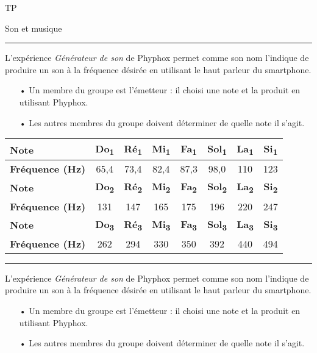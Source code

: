 \documentclass[12pt,a4paper]{article}
\begin{document}
\begin{header}
TP

Son et musique
\end{header}

\hrule{}
\vspace{5pt}

L'expérience \emph{Générateur de son} de Phyphox permet comme son nom l'indique de produire un son à la fréquence désirée en utilisant le haut parleur du smartphone.
\begin{itemize}
\item[•] Un membre du groupe est l'émetteur : il choisi une note et la produit en utilisant Phyphox.
\item[•] Les autres membres du groupe doivent déterminer de quelle note il s'agit.
\end{itemize}

\begin{center}
\begin{tabular}{l|c|c|c|c|c|c|c}
\textbf{Note}						& \textbf{Do\textsubscript{1}} & \textbf{Ré\textsubscript{1}} & \textbf{Mi\textsubscript{1}} & \textbf{Fa\textsubscript{1}} & \textbf{Sol\textsubscript{1}} & \textbf{La\textsubscript{1}} & \textbf{Si\textsubscript{1}} \\
\hline
\textbf{Fréquence (Hz)} 	& 65{,}4 & 73{,}4 & 82{,}4 & 87{,}3 & 98{,}0 & 110 & 123 \\
\hline \hline
\textbf{Note}						& \textbf{Do\textsubscript{2}} & \textbf{Ré\textsubscript{2}} & \textbf{Mi\textsubscript{2}} & \textbf{Fa\textsubscript{2}} & \textbf{Sol\textsubscript{2}} & \textbf{La\textsubscript{2}} & \textbf{Si\textsubscript{2}} \\
\hline
\textbf{Fréquence (Hz)} 	& 131 & 147 & 165 & 175 & 196 & 220 & 247 \\
\hline \hline
\textbf{Note}						& \textbf{Do\textsubscript{3}} & \textbf{Ré\textsubscript{3}} & \textbf{Mi\textsubscript{3}} & \textbf{Fa\textsubscript{3}} & \textbf{Sol\textsubscript{3}} & \textbf{La\textsubscript{3}} & \textbf{Si\textsubscript{3}} \\
\hline
\textbf{Fréquence (Hz)} 	& 262 & 294 & 330 & 350 & 392 & 440 & 494
\end{tabular}
\end{center}

\vspace{5pt}
\hrule{}
\vspace{5pt}

L'expérience \emph{Générateur de son} de Phyphox permet comme son nom l'indique de produire un son à la fréquence désirée en utilisant le haut parleur du smartphone.
\begin{itemize}
\item[•] Un membre du groupe est l'émetteur : il choisi une note et la produit en utilisant Phyphox.
\item[•] Les autres membres du groupe doivent déterminer de quelle note il s'agit.
\end{itemize}
\end{document}
